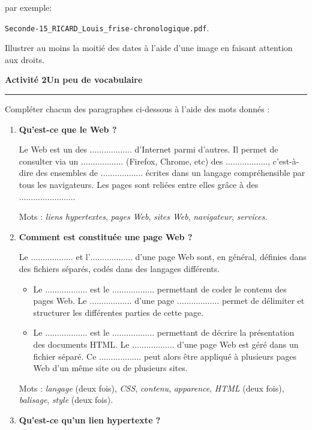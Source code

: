 \documentclass[a4paper]{article}
\begin{document}
par exemple:

\begin{center}
  \verb|Seconde-15_RICARD_Louis_frise-chronologique.pdf|.
\end{center}

Illustrer au moins la moitié des dates à l'aide d'une image en faisant attention aux droits.

\bigskip

\noindent\textbf{Activité 2}\hfill{}\textbf{Un peu de vocabulaire}
\smallskip
\hrule
\medskip

Compléter chacun des paragraphes ci-dessous à l'aide des mots donnés :

\begin{enumerate}
  \item \textbf{Qu'est-ce que le Web ?}

    \smallskip

    Le Web est un des $\hdots\hdots\hdots\hdots\hdots\hdots$ d'Internet parmi d'autres. Il permet de consulter via un $\hdots\hdots\hdots\hdots\hdots\hdots$ (Firefox, Chrome, etc) des $\hdots\hdots\hdots\hdots\hdots\hdots$, c'est-à-dire des ensembles de $\hdots\hdots\hdots\hdots\hdots\hdots$ écrites dans un langage compréhensible par tous les navigateurs. Les pages sont reliées entre elles grâce à des $\hdots\hdots\hdots\hdots\hdots\hdots\hdots\hdots$

    \smallskip

    Mots : \textit{liens hypertextes}, \textit{pages Web}, \textit{sites Web}, \textit{navigateur}, \textit{services}.

  \item \textbf{Comment est constituée une page Web ?}

    \smallskip

    Le $\hdots\hdots\hdots\hdots\hdots\hdots$ et l'$\hdots\hdots\hdots\hdots\hdots\hdots$ d'une page Web sont, en général, définies dans des fichiers séparés, codés dans des langages différents.
    \begin{itemize}
      \item Le $\hdots\hdots\hdots\hdots\hdots\hdots$ est le $\hdots\hdots\hdots\hdots\hdots\hdots$ permettant de coder le contenu des pages Web. Le $\hdots\hdots\hdots\hdots\hdots\hdots$ d'une page $\hdots\hdots\hdots\hdots\hdots\hdots$ permet de délimiter et structurer les différentes parties de cette page.
      \item Le $\hdots\hdots\hdots\hdots\hdots\hdots$ est le $\hdots\hdots\hdots\hdots\hdots\hdots$ permettant de décrire la présentation des documents HTML. Le \og{}$\hdots\hdots\hdots\hdots\hdots\hdots$\fg{} d'une page Web est géré dans un fichier séparé. Ce \og{}$\hdots\hdots\hdots\hdots\hdots\hdots$\fg{} peut alors être appliqué à plusieurs pages Web d'un même site ou de plusieurs sites.
    \end{itemize}
    Mots : \textit{langage} (deux fois), \textit{CSS}, \textit{contenu}, \textit{apparence}, \textit{HTML} (deux fois), \textit{balisage}, \textit{style} (deux fois).
  \item \textbf{Qu'est-ce qu'un lien hypertexte ?}


\end{enumerate}
\end{document}

